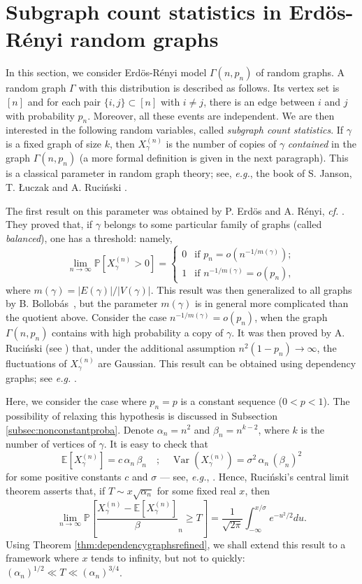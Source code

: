 \documentclass[12pt,a4paper,reqno]{amsart}
\theoremstyle{remark}
\newcommand{\esper}{\mathbb{E}}
\newcommand{\proba}{\mathbb{P}}
\newcommand{\alphan}{\alpha_n}
\newcommand{\betan}{\beta_n}
\newcommand{\SubGraph}{X^{(n)}}
\DeclareMathOperator\Var{Var}
\begin{document}
\section{Subgraph count statistics in Erd\"os-R\'enyi random graphs}\label{sec:erdosrenyi}
In this section, we consider Erd\"os-R\'enyi model $\Gamma(n,p_n)$ of random graphs. A random graph $\Gamma$ with this distribution is described as follows. Its vertex set is $[n]$ and for each pair $\{i,j\} \subset [n]$  with $i \neq j$, there is an edge between $i$ and $j$ with probability $p_n$. Moreover, all these events are independent. We are then interested in the following random variables, called {\em subgraph count statistics}. If $\gamma$ is a fixed graph of size $k$, then $\SubGraph_\gamma$ is the number of copies of $\gamma$ {\em contained} in the graph $\Gamma(n,p_n)$ (a more formal definition is given in the next paragraph). This is a classical parameter in random graph theory; see, {\em e.g.}, the book of S. Janson, T. {\L}uczak and A. Ruci\'nski \cite{JLR00}. \bigskip

The first result on this parameter was obtained by P. Erd\"os and A. R\'enyi, \emph{cf.} \cite{ER60}. They proved that, if $\gamma$ belongs to some particular family of graphs (called {\em balanced}),
one has a threshold: namely,
$$\lim_{n \to \infty} \proba[\SubGraph_\gamma >0]=\begin{cases}
    0 & \text{if }p_n=o\left(n^{-1/m(\gamma)}\right); \\
1 & \text{if }n^{-1/m(\gamma)}=o(p_n), \end{cases}
$$
where $m(\gamma)=|E(\gamma)|/|V(\gamma)|$.
This result was then generalized to all graphs by B. Bollob\'as~\cite{Bol01}, but the parameter $m(\gamma)$ is in general more complicated than the quotient above. Consider the case $n^{-1/m(\gamma)}=o(p_n)$, when the graph $\Gamma(n,p_n)$ contains with high probability a copy of $\gamma$. It was then proved by A. Ruci\'nski (see \cite{Ruc88}) that, under the additional assumption $n^2 (1-p_n) \to \infty$, the fluctuations of $\SubGraph_\gamma$ are Gaussian. This result can be obtained using dependency graphs; see {\em e.g.}  \cite[pages 147-152]{JLR00}.\bigskip

Here, we consider the case where $p_n=p$ is a constant sequence ($0<p<1$). The possibility of relaxing this hypothesis is discussed in Subsection \ref{subsec:nonconstantproba}. Denote $\alphan=n^2$ and $\betan=n^{k-2}$, where $k$ is the number of vertices of $\gamma$. It is easy to check that 
$$\esper[\SubGraph_\gamma]=c \,\alphan \,\betan \quad;\quad \Var(\SubGraph_\gamma)=\sigma^2 \,\alphan \,(\betan)^2$$ 
for some positive constants $c$ and $\sigma$ --- see, {\em e.g.}, \cite[Lemma 3.5]{JLR00}. Hence, Ruci\'nski's central limit theorem asserts that,  if $T \sim x \sqrt{\alphan}$ for some fixed real $x$, then
$$ \lim_{n\to \infty} \proba \left[ \frac{\SubGraph_\gamma - \esper[\SubGraph_\gamma]}
\betan \geq T \right] = \frac{1}{ \sqrt{2\pi}}
\int_{-\infty}^{x/\sigma} e^{-u^2/2} du.$$
Using Theorem \ref{thm:dependencygraphsrefined}, we shall extend this result to a framework where $x$ tends to infinity, but not to quickly: $(\alphan)^{1/2} \ll T \ll (\alphan)^{3/4}$.
\end{document}
